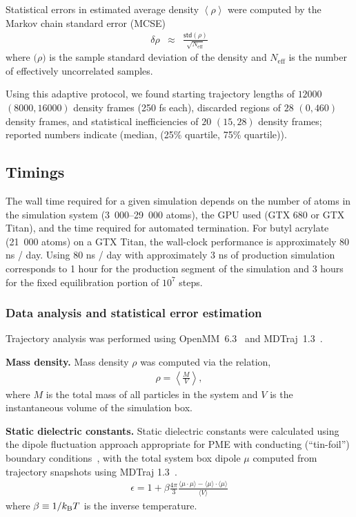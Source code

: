 \documentclass[journal=jacsat,manuscript=article]{achemso}
\begin{document}
Statistical errors in estimated average density $\left< \rho \right>$ were computed by the Markov chain standard error (MCSE)
\begin{eqnarray}
\delta \rho &\approx& \frac{\mathsf{std}(\rho)}{\sqrt{N_\mathrm{eff}}} \label{equation:density-standard-error}
\end{eqnarray}
where $\mathsf(\rho)$ is the sample standard deviation of the density and $N_\mathrm{eff}$ is the number of effectively uncorrelated samples.  

Using this adaptive protocol, we found starting trajectory lengths of $12000$ $(8000, 16000)$ density frames (250 fs each), discarded regions of $28$  $(0, 460)$ density frames, and statistical inefficiencies of $20$ $(15, 28)$ density frames; reported numbers indicate (median, (25\% quartile, 75\% quartile)).  

\subsection{Timings}

The wall time required for a given simulation depends on the number of atoms in the simulation system (3~000--29~000 atoms), the GPU used (GTX 680 or GTX Titan), and the time required for automated termination.  
For butyl acrylate (21~000 atoms) on a GTX Titan, the wall-clock performance is approximately 80 ns / day.  Using 80 ns / day with approximately 3 ns of production simulation corresponds to 1 hour for the production segment of the simulation and 3 hours for the fixed equilibration portion of $10^7$ steps.  

\subsubsection{Data analysis and statistical error estimation}

Trajectory analysis was performed using OpenMM~6.3~\cite{eastman2012openmm} and MDTraj~1.3~\cite{mcgibbon2014mdtraj}.  

{\bf Mass density.}
Mass density $\rho$ was computed via the relation,
\begin{eqnarray}
\rho = \left\langle \frac{M}{V} \right\rangle \label{equation:mass-density} ,
 \end{eqnarray}
where $M$ is the total mass of all particles in the system and $V$ is the instantaneous volume of the simulation box.

{\bf Static dielectric constants.}
Static dielectric constants were calculated using the dipole fluctuation approach appropriate for PME with conducting (``tin-foil'') boundary conditions~\cite{horn2004, neumann1983dipole}, with the total system box dipole $\mu$ computed from trajectory snapshots using MDTraj 1.3~\cite{mcgibbon2014mdtraj}.
\begin{eqnarray}
\epsilon = 1 + \beta \frac{4\pi}{3} \frac{\langle \mu \cdot \mu \rangle - \langle \mu \rangle \cdot \langle \mu \rangle}{\langle V \rangle} \label{equation:dielectric_calculation}
\end{eqnarray}
where $\beta \equiv 1 / k_\textnormal{B} T$ is the inverse temperature.
\end{document}
